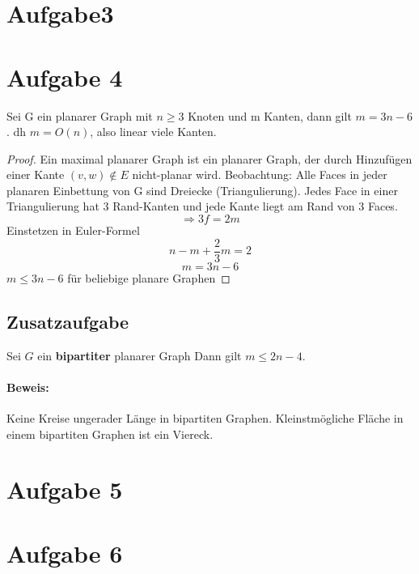 \documentclass[10pt,a4paper]{article}
\begin{document}
\section*{Aufgabe3}


\section*{Aufgabe 4}
	Sei G ein planarer Graph mit $ n \geq 3 $ Knoten und m Kanten, dann gilt $ m = 3n-6 $. dh $ m=O(n) $, also linear viele Kanten.
	\begin{proof}
		Ein maximal planarer Graph ist ein planarer Graph, der durch Hinzufügen einer Kante $ (v,w) \notin E $ nicht-planar wird. Beobachtung: Alle Faces in jeder planaren Einbettung von G sind Dreiecke (Triangulierung). Jedes Face in einer Triangulierung hat 3 Rand-Kanten und jede Kante liegt am Rand von 3 Faces. 
		$$\Rightarrow 3f = 2m $$
		Einstetzen in Euler-Formel
		$$ n - m + \frac{2}{3}m = 2$$
		$$ m = 3n-6$$
		$ m \leq 3n-6 $ für beliebige planare Graphen
	\end{proof}

\subsection*{Zusatzaufgabe}
Sei $G$ ein \textbf{bipartiter} planarer Graph Dann gilt $ m \leq 2n-4 $. 

\paragraph{Beweis:} Keine Kreise ungerader Länge in bipartiten Graphen. Kleinstmögliche Fläche in einem bipartiten Graphen ist ein Viereck.


\section*{Aufgabe 5}


\section*{Aufgabe 6}
\end{document}
